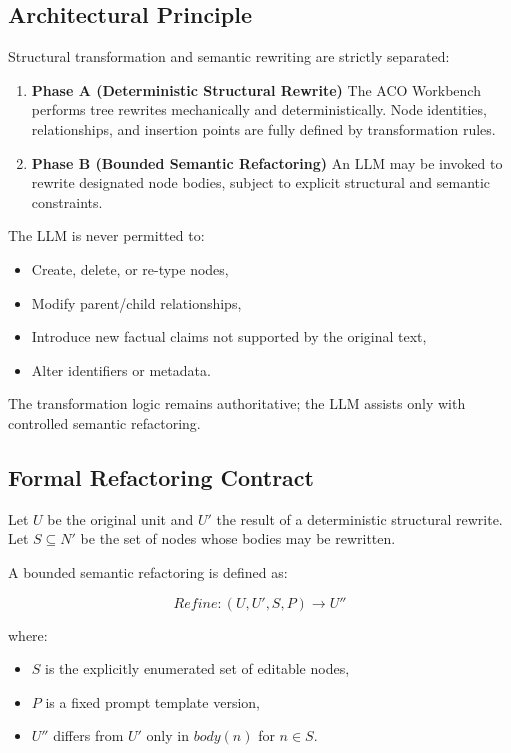 \documentclass[12pt,twoside,a4paper]{article}
\begin{document}
\subsection{Architectural Principle}

Structural transformation and semantic rewriting are strictly separated:

\begin{enumerate}
  \item \textbf{Phase A (Deterministic Structural Rewrite)}  
        The ACO Workbench performs tree rewrites mechanically and deterministically. Node identities, relationships, and insertion points are fully defined by transformation rules.

  \item \textbf{Phase B (Bounded Semantic Refactoring)}  
        An LLM may be invoked to rewrite designated node bodies, subject to explicit structural and semantic constraints.
\end{enumerate}

The LLM is never permitted to:
\begin{itemize}
  \item Create, delete, or re-type nodes,
  \item Modify parent/child relationships,
  \item Introduce new factual claims not supported by the original text,
  \item Alter identifiers or metadata.
\end{itemize}

The transformation logic remains authoritative; the LLM assists only with controlled semantic refactoring.

\subsection{Formal Refactoring Contract}

Let $U$ be the original unit and $U'$ the result of a deterministic structural rewrite. Let $S \subseteq N'$ be the set of nodes whose bodies may be rewritten.

A bounded semantic refactoring is defined as:

\[
Refine : (U, U', S, P) \rightarrow U''
\]

where:

\begin{itemize}
  \item $S$ is the explicitly enumerated set of editable nodes,
  \item $P$ is a fixed prompt template version,
  \item $U''$ differs from $U'$ only in $body(n)$ for $n \in S$.
\end{itemize}
\end{document}
